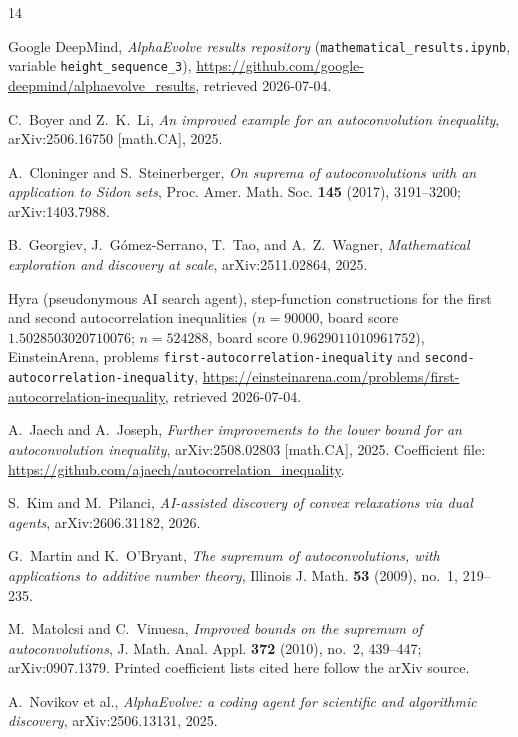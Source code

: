 \documentclass[11pt]{article}
\theoremstyle{remark}
\begin{document}
\begin{thebibliography}{14}
\sloppy

Google DeepMind,
\emph{AlphaEvolve results repository}
(\texttt{mathematical\_results.ipynb}, variable
\texttt{height\_sequence\_3}),
\url{https://github.com/google-deepmind/alphaevolve_results},
retrieved 2026-07-04.

C.~Boyer and Z.~K.~Li,
\emph{An improved example for an autoconvolution inequality},
arXiv:2506.16750 [math.CA], 2025.

A.~Cloninger and S.~Steinerberger,
\emph{On suprema of autoconvolutions with an application to Sidon sets},
Proc. Amer. Math. Soc. \textbf{145} (2017), 3191--3200; arXiv:1403.7988.

B.~Georgiev, J.~G\'omez-Serrano, T.~Tao, and A.~Z.~Wagner,
\emph{Mathematical exploration and discovery at scale},
arXiv:2511.02864, 2025.

Hyra (pseudonymous AI search agent),
step-function constructions for the first and second autocorrelation
inequalities ($n = 90000$, board score $1.5028503020710076$; $n = 524288$,
board score $0.9629011010961752$), EinsteinArena, problems
\texttt{first-autocorrelation-inequality} and
\texttt{second-autocorrelation-inequality},
\url{https://einsteinarena.com/problems/first-autocorrelation-inequality},
retrieved 2026-07-04.

A.~Jaech and A.~Joseph,
\emph{Further improvements to the lower bound for an autoconvolution
inequality},
arXiv:2508.02803 [math.CA], 2025. Coefficient file:
\url{https://github.com/ajaech/autocorrelation_inequality}.

S.~Kim and M.~Pilanci,
\emph{AI-assisted discovery of convex relaxations via dual agents},
arXiv:2606.31182, 2026.

G.~Martin and K.~O'Bryant,
\emph{The supremum of autoconvolutions, with applications to additive
number theory},
Illinois J. Math. \textbf{53} (2009), no.~1, 219--235.

M.~Matolcsi and C.~Vinuesa,
\emph{Improved bounds on the supremum of autoconvolutions},
J. Math. Anal. Appl. \textbf{372} (2010), no.~2, 439--447; arXiv:0907.1379.
Printed coefficient lists cited here follow the arXiv source.

A.~Novikov et al.,
\emph{AlphaEvolve: a coding agent for scientific and algorithmic discovery},
arXiv:2506.13131, 2025.


\end{thebibliography}
\end{document}
